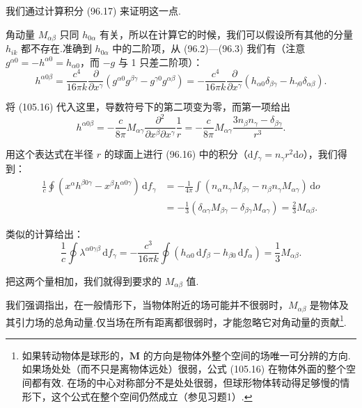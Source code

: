 我们通过计算积分 (96.17) 来证明这一点.

角动量 $M_{\alpha\beta}$ 只同 $h_{0\alpha}$ 有关，所以在计算它的时候，我们可以假设所有其他的分量 $h_{ik}$ 都不存在.准确到 $h_{0\alpha}$ 中的二阶项，从 (96.2)—(96.3) 我们有（注意 $g^{\alpha0}=-h^{\alpha0}=h_{\alpha0}$，而 $-g$ 与 1 只差二阶项）：
\begin{equation*}
  h^{\alpha0\beta}
  =\frac{c^{4}}{16\pi k}\frac{\partial}{\partial x^{\gamma}}
  (g^{\alpha0}g^{\beta\gamma}-g^{\gamma0}g^{\alpha\beta})
  =-\frac{c^{4}}{16\pi k}\frac{\partial}{\partial x^{\gamma}}
  (h_{\alpha0}\delta_{\beta\gamma}-h_{\gamma0}\delta_{\alpha\beta}).
\end{equation*}

将 (105.16) 代入这里，导数符号下的第二项变为零，而第一项给出
\begin{equation*}
  h^{\alpha0\beta}
  =-\frac{c}{8\pi}M_{\alpha\gamma}
  \frac{\partial^{2}}{\partial x^{\beta}\partial x^{\gamma}}\frac{1}{r}
  =-\frac{c}{8\pi}M_{\alpha\gamma}
  \frac{3n_{\beta}n_{\gamma}-\delta_{\beta\gamma}}{r^{3}}.
\end{equation*}

用这个表达式在半径 $r$ 的球面上进行 (96.16) 中的积分（$\mathrm{d}f_\gamma=n_\gamma r^2\mathrm{d}o$），我们得到：
\begin{equation*}
\begin{aligned}
  \frac{1}{c}\oint(x^{\alpha}h^{\beta0\gamma}
  -x^{\beta}h^{\alpha0\gamma})\,\mathrm{d}f_{\gamma}
  &=-\frac{1}{4\pi}\int(n_{\alpha}n_{\gamma}M_{\beta\gamma}
  -n_{\beta}n_{\gamma}M_{\alpha\gamma})\,\mathrm{d}o\\
  &=-\frac{1}{3}(\delta_{\alpha\gamma}M_{\beta\gamma}
  -\delta_{\beta\gamma}M_{\alpha\gamma})
  =\frac{2}{3}M_{\alpha\beta}.
\end{aligned}
\end{equation*}

类似的计算给出：
\begin{equation*}
  \frac{1}{c}\oint\lambda^{\alpha0\gamma\beta}\,\mathrm{d}f_{\gamma}
  =-\frac{c^{3}}{16\pi k}\oint
  (h_{\alpha0}\,\mathrm{d}f_{\beta}-h_{\beta0}\,\mathrm{d}f_{\alpha})
  =\frac{1}{3}M_{\alpha\beta}.
\end{equation*}

把这两个量相加，我们就得到要求的 $M_{\alpha\beta}$ 值.

我们强调指出，在一般情形下，当物体附近的场可能并不很弱时，$M_{\alpha\beta}$ 是物体及其引力场的总角动量.仅当场在所有距离都很弱时，才能忽略它对角动量的贡献\footnote{如果转动物体是球形的，$\boldsymbol{M}$ 的方向是物体外整个空间的场唯一可分辨的方向. 如果场处处（而不只是离物体远处）很弱，公式 (105.16) 在物体外面的整个空间都有效. 在场的中心对称部分不是处处很弱，但球形物体转动得足够慢的情形下，这个公式在整个空间仍然成立（参见习题1）.}.

